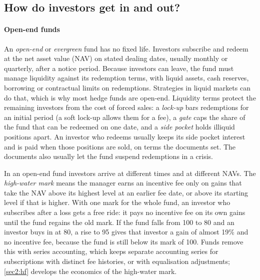 \begin{chapterrefs}
\FloatBarrier
\section{How do investors get in and out?}
\label{sec2:openclosed}

\paragraph{Open-end funds}
An \emph{open-end} or \emph{evergreen} fund has no fixed life. Investors subscribe and redeem at the net
asset value (NAV) on stated dealing dates, usually monthly or quarterly, after a notice period. Because
investors can leave, the fund must manage liquidity against its redemption terms, with liquid
assets, cash reserves, borrowing or contractual limits on redemptions. Strategies in
liquid markets can do that, which is why most hedge funds are open-end. Liquidity terms protect the remaining investors from the cost of
forced sales: a \emph{lock-up} bars redemptions for an initial period (a soft lock-up allows them for a
fee), a \emph{gate} caps the share of the fund that can be redeemed on one date, and a \emph{side pocket}
holds illiquid positions apart. An investor who redeems usually keeps its side pocket interest and is
paid when those positions are sold, on terms the documents set. The documents also usually let the
fund suspend redemptions in a crisis.

In an open-end fund investors arrive at different times and at different NAVs. The
\emph{high-water mark} means the manager earns an incentive fee only on gains that take the NAV above
its highest level at an earlier fee date, or above its starting level if that is higher. With one mark for the whole fund,
an investor who subscribes after a loss gets a free ride: it pays no incentive fee on its own gains
until the fund regains the old mark. If the fund falls from 100 to 80 and
an investor buys in at 80, a rise to 95 gives that investor a gain of almost 19\% and no incentive fee,
because the fund is still below its mark of 100. Funds remove this with series accounting, which keeps separate
accounting series for subscriptions with distinct fee histories, or with equalisation adjustments;
\cref{sec2:hf} develops the economics of the high-water mark.


\end{chapterrefs}
